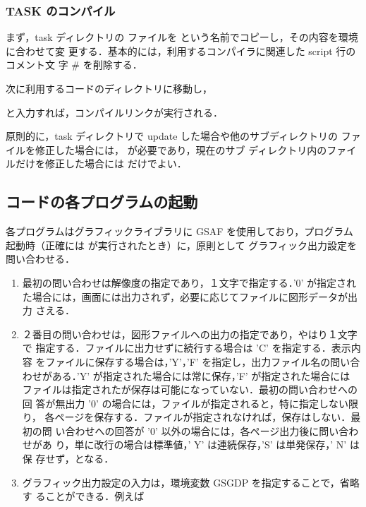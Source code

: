 \documentclass[11pt]{jarticle}
\begin{document}
\subsubsection{TASK のコンパイル}

まず，task ディレクトリの  ファイルを
 という名前でコピーし，その内容を環境に合わせて変
更する．基本的には，利用するコンパイラに関連した script 行のコメント文
字 \# を削除する．

次に利用するコードのディレクトリに移動し，


と入力すれば，コンパイルリンクが実行される．

原則的に，task ディレクトリで update した場合や他のサブディレクトリの
ファイルを修正した場合には， が必要であり，現在のサブ
ディレクトリ内のファイルだけを修正した場合には  だけでよい．

\subsection{コードの各プログラムの起動}

各プログラムはグラフィックライブラリに GSAF を使用しており，プログラム
起動時（正確には  が実行されたとき）に，原則として
グラフィック出力設定を問い合わせる．
\begin{enumerate}
\item
最初の問い合わせは解像度の指定であり，１文字で指定する．'0' が指定され
た場合には，画面には出力されず，必要に応じてファイルに図形データが出力
さえる．
\item
２番目の問い合わせは，図形ファイルへの出力の指定であり，やはり１文字で
指定する．ファイルに出力せずに続行する場合は 'C' を指定する．表示内容
をファイルに保存する場合は，'Y'，'F' を指定し，出力ファイル名の問い合
わせがある．'Y' が指定された場合には常に保存，'F' が指定された場合には
ファイルは指定されたが保存は可能になっていない．最初の問い合わせへの回
答が無出力 '0' の場合には，ファイルが指定されると，特に指定しない限り，
各ページを保存する．ファイルが指定されなければ，保存はしない．最初の問
い合わせへの回答が '0' 以外の場合には，各ページ出力後に問い合わせがあ
り，単に改行の場合は標準値，' Y' は連続保存，'S' は単発保存，' N' は保
存せず，となる．

\item
グラフィック出力設定の入力は，環境変数 GSGDP を指定することで，省略す
ることができる．例えば

\end{enumerate}
\end{document}
